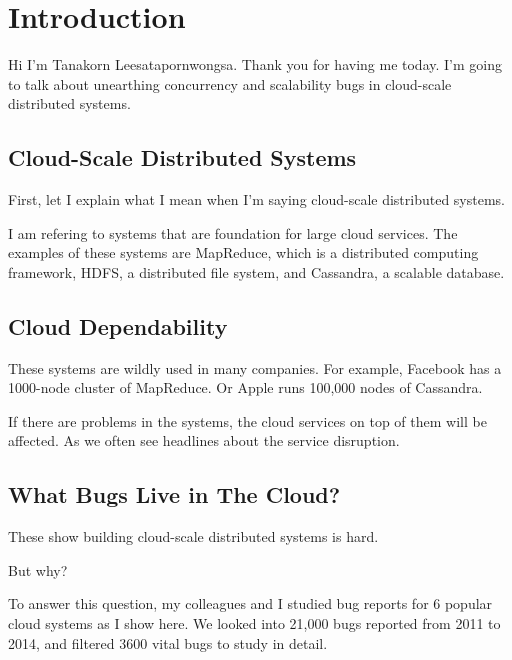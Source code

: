 

\section{Introduction}

Hi I'm Tanakorn Leesatapornwongsa. Thank you for having me today. I'm going to
talk about unearthing concurrency and scalability bugs in cloud-scale
distributed systems.

\subsection{Cloud-Scale Distributed Systems}

First, let I explain what I mean when I'm saying cloud-scale distributed
systems.

I am refering to systems that are foundation for large cloud services. The
examples of these systems are MapReduce, which is a distributed computing
framework, HDFS, a distributed file system, and Cassandra, a scalable database.

\subsection{Cloud Dependability}

These systems are wildly used in many companies. For example, Facebook has a
1000-node cluster of MapReduce. Or Apple runs 100,000 nodes of Cassandra.

If there are problems in the systems, the cloud services on top of them will be
affected. As we often see headlines about the service disruption.


\subsection{What Bugs Live in The Cloud?}

These show building cloud-scale distributed systems is hard.

But why?

To answer this question, my colleagues and I studied bug reports for 6 popular
cloud systems as I show here. We looked into 21,000 bugs reported from 2011 to
2014, and filtered 3600 vital bugs to study in detail.


